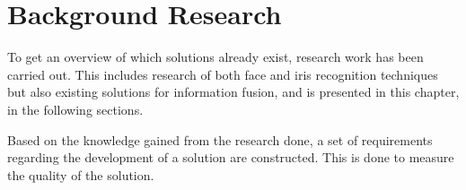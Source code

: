 \chapter{Background Research}\glsresetall
\label{cha:Research}
To get an overview of which solutions already exist, research work has been carried out. This includes research of both face and iris recognition techniques but also existing solutions for information fusion, and is presented in this chapter, in the following sections.




Based on the knowledge gained from the research done, a set of requirements regarding the development of a solution are constructed. This is done to measure the quality of the solution.